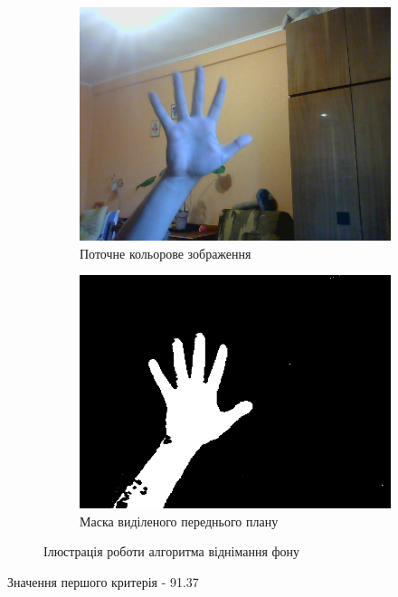 \begin{figure}[H]
	\centering
	\begin{subfigure}[b]{0.45\textwidth}
		\includegraphics[width=\textwidth]{practise/img/hand1}
		\caption{Поточне кольорове зображення}
	\end{subfigure}
	\hfill
	\begin{subfigure}[b]{0.45\textwidth}
		\includegraphics[width=\textwidth]{practise/img/mask1}
		\caption{Маска виділеного переднього плану}
	\end{subfigure}
	\caption{Ілюстрація роботи алгоритма віднімання фону}
	\label{fig:background_subtraction1}
\end{figure}

Значення першого критерія - 91.37%

